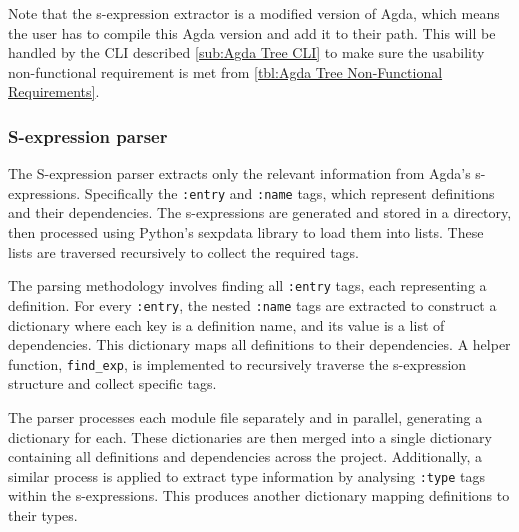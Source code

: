 Note that the s-expression extractor is a modified version of Agda, which means
the user has to compile this Agda version and add it to their path. This will
be handled by the CLI described \cref{sub:Agda Tree CLI} to make sure the
usability non-functional requirement is met from \cref{tbl:Agda Tree
Non-Functional Requirements}.

\subsubsection{S-expression parser}\label{sub:s-expression parser implementation}

The S-expression parser extracts only the relevant information from Agda's
s-expressions. Specifically the \texttt{:entry} and \texttt{:name} tags, which
represent definitions and their dependencies. The s-expressions are generated
and stored in a directory, then processed using Python's sexpdata library to
load them into lists. These lists are traversed recursively to collect the
required tags.

The parsing methodology involves finding all \texttt{:entry} tags, each
representing a definition. For every \texttt{:entry}, the nested \texttt{:name}
tags are extracted to construct a dictionary where each key is a definition
name, and its value is a list of dependencies. This dictionary maps all
definitions to their dependencies. A helper function, \texttt{find\_exp}, is
implemented to recursively traverse the s-expression structure and collect
specific tags.

The parser processes each module file separately and in parallel, generating a
dictionary for each. These dictionaries are then merged into a single
dictionary containing all definitions and dependencies across the project.
Additionally, a similar process is applied to extract type information by
analysing \texttt{:type} tags within the s-expressions. This produces another
dictionary mapping definitions to their types.



